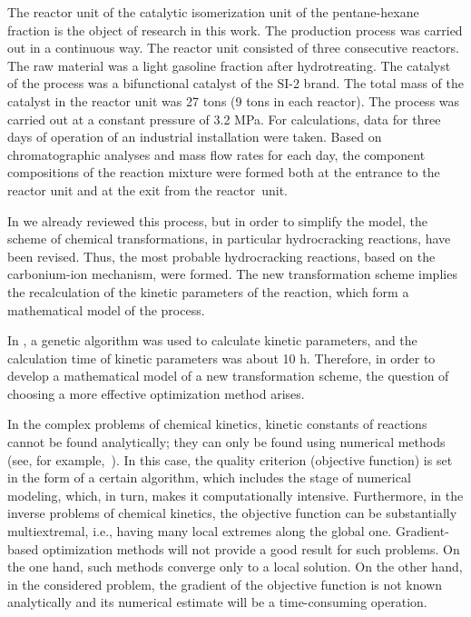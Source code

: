 \documentclass[mathematics,article,accept,pdftex,moreauthors]{Definitions/mdpi}
\begin{document}
	{The reactor unit of the catalytic isomerization unit of the pentane-hexane fraction is the object of research in this work. The production process was carried out in a continuous way. The reactor unit consisted of three consecutive reactors.
		The raw material was a light gasoline fraction after hydrotreating. The catalyst of the process was a bifunctional catalyst of the SI-2 brand. The total mass of the catalyst in the reactor unit was 27 tons (9 tons in each reactor). The process was carried out at a constant pressure of 3.2 MPa.
		For calculations, data for three days of operation of an industrial installation were taken.
		Based on chromatographic analyses and mass flow rates for each day, the component compositions of the reaction mixture were formed both at the entrance to the reactor unit and at the exit from the reactor~unit.}
	
	In \cite{enik2021} we already reviewed this process, but in order to simplify the model, the scheme of chemical transformations, in particular hydrocracking reactions, have been revised. Thus, the most probable hydrocracking reactions, based on the carbonium-ion mechanism, were formed. The new transformation scheme implies the recalculation of the kinetic parameters of the reaction, which form a mathematical model of the process.
	
	In \cite{enik2021}, a genetic algorithm was used to calculate kinetic parameters, and the calculation time of kinetic parameters was about 10 h. Therefore, in order to develop a mathematical model of a new transformation scheme, the question of choosing a more effective optimization method arises.
	
	In the complex problems of chemical kinetics, kinetic constants of reactions cannot be found analytically; they can only be found using numerical methods (see, for example,~\cite{Enikeeva2020}). In this case, the quality criterion (objective function) is set in the form of a certain algorithm, which includes the stage of numerical modeling, which, in turn, makes it computationally intensive. Furthermore, in the inverse problems of chemical kinetics, the objective function can be substantially multiextremal, i.e., having many local extremes along the global one. 
	{Gradient-based optimization methods will not provide a good result for such problems. On the one hand, such methods converge only to a local solution. On the other hand, in the considered problem, the gradient of the objective function is not known analytically and its numerical estimate will be a time-consuming operation.}
	
\end{document}

